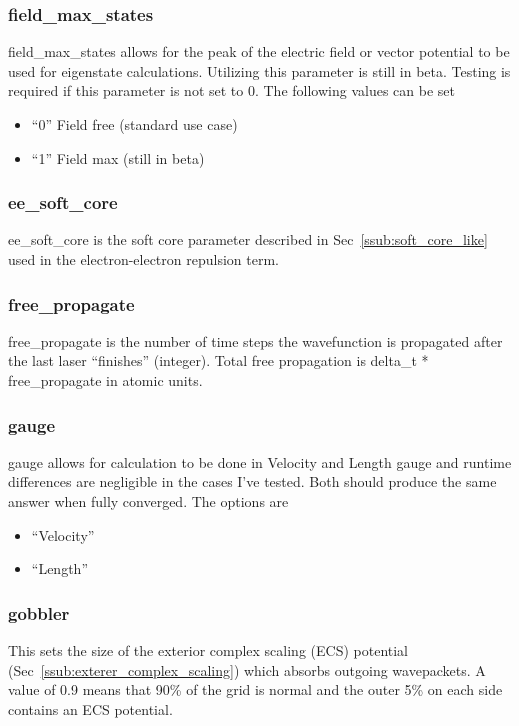 \documentclass{article}
\begin{document}
\subsubsection{field\_max\_states}
\label{ssub:field_max_states}
field\_max\_states allows for the peak of the electric field or vector potential to be used for eigenstate calculations. Utilizing this parameter is still in beta. Testing is required if this parameter is not set to 0. The following values can be set
\begin{itemize}
  \item ``0'' Field free (standard use case)
  \item ``1'' Field max (still in beta)
\end{itemize}

\subsubsection{ee\_soft\_core}
ee\_soft\_core is the soft core parameter described in Sec~\ref{ssub:soft_core_like} used in the electron-electron repulsion term.

\subsubsection{free\_propagate}
free\_propagate is the number of time steps the wavefunction is propagated after the last laser ``finishes'' (integer). Total free propagation is delta\_t * free\_propagate in atomic units.

\subsubsection{gauge}
gauge allows for calculation to be done in Velocity and Length gauge and runtime differences are negligible in the cases I've tested. Both should produce the same answer when fully converged. The options are
\begin{itemize}
  \item ``Velocity''
  \item ``Length''
\end{itemize}

\subsubsection{gobbler}
This sets the size of the exterior complex scaling (ECS) potential (Sec~\ref{ssub:exterer_complex_scaling}) which absorbs outgoing wavepackets. A value of 0.9 means that 90\% of the grid is normal and the outer 5\% on each side contains an ECS potential.
\end{document}
